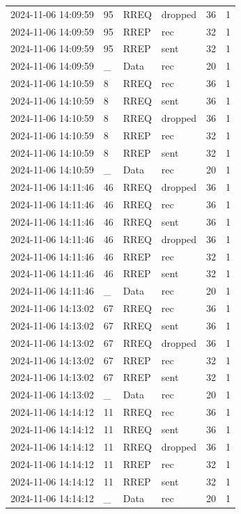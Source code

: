 \documentclass[]{nsm-thesis}
\begin{document}
\begin{longtable}{llllll}
2024-11-06 14:09:59 & 95 & RREQ & dropped & 36 & 1 \\
2024-11-06 14:09:59 & 95 & RREP & rec & 32 & 1 \\
2024-11-06 14:09:59 & 95 & RREP & sent & 32 & 1 \\
2024-11-06 14:09:59 & _ & Data & rec & 20 & 1 \\
2024-11-06 14:10:59 & 8 & RREQ & rec & 36 & 1 \\
2024-11-06 14:10:59 & 8 & RREQ & sent & 36 & 1 \\
2024-11-06 14:10:59 & 8 & RREQ & dropped & 36 & 1 \\
2024-11-06 14:10:59 & 8 & RREP & rec & 32 & 1 \\
2024-11-06 14:10:59 & 8 & RREP & sent & 32 & 1 \\
2024-11-06 14:10:59 & _ & Data & rec & 20 & 1 \\
2024-11-06 14:11:46 & 46 & RREQ & dropped & 36 & 1 \\
2024-11-06 14:11:46 & 46 & RREQ & rec & 36 & 1 \\
2024-11-06 14:11:46 & 46 & RREQ & sent & 36 & 1 \\
2024-11-06 14:11:46 & 46 & RREQ & dropped & 36 & 1 \\
2024-11-06 14:11:46 & 46 & RREP & rec & 32 & 1 \\
2024-11-06 14:11:46 & 46 & RREP & sent & 32 & 1 \\
2024-11-06 14:11:46 & _ & Data & rec & 20 & 1 \\
2024-11-06 14:13:02 & 67 & RREQ & rec & 36 & 1 \\
2024-11-06 14:13:02 & 67 & RREQ & sent & 36 & 1 \\
2024-11-06 14:13:02 & 67 & RREQ & dropped & 36 & 1 \\
2024-11-06 14:13:02 & 67 & RREP & rec & 32 & 1 \\
2024-11-06 14:13:02 & 67 & RREP & sent & 32 & 1 \\
2024-11-06 14:13:02 & _ & Data & rec & 20 & 1 \\
2024-11-06 14:14:12 & 11 & RREQ & rec & 36 & 1 \\
2024-11-06 14:14:12 & 11 & RREQ & sent & 36 & 1 \\
2024-11-06 14:14:12 & 11 & RREQ & dropped & 36 & 1 \\
2024-11-06 14:14:12 & 11 & RREP & rec & 32 & 1 \\
2024-11-06 14:14:12 & 11 & RREP & sent & 32 & 1 \\
2024-11-06 14:14:12 & _ & Data & rec & 20 & 1 \\

\end{longtable}
\end{document}
